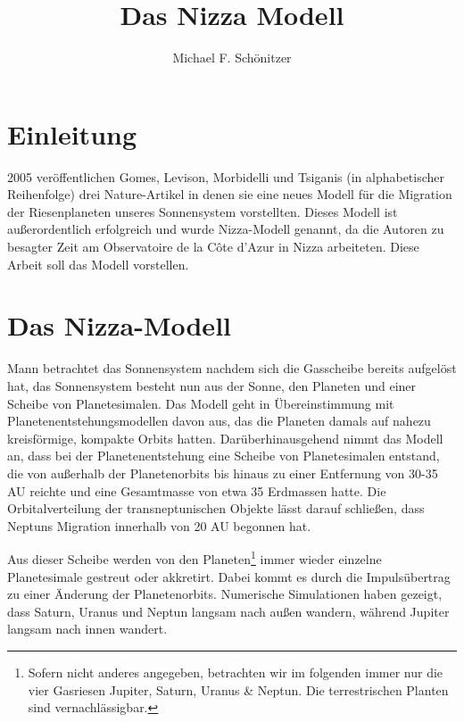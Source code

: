 \documentclass[10pt,a4paper,twoside]{article}
\author{Michael F. Schönitzer}
\title{Das Nizza Modell}
\begin{document}
\maketitle

\section{Einleitung}
2005 veröffentlichen Gomes, Levison, Morbidelli und Tsiganis (in alphabetischer Reihenfolge) drei Nature-Artikel\cite{Gomes2005}\cite{Tsiganis2005}\cite{Morbidelli2005} %
in denen sie eine neues Modell für die Migration der Riesenplaneten unseres Sonnensystem vorstellten. Dieses Modell ist außerordentlich erfolgreich und wurde Nizza-Modell genannt, da die Autoren zu besagter Zeit am Observatoire de la Côte d’Azur in Nizza arbeiteten. Diese Arbeit soll das Modell vorstellen.

\section{Das Nizza-Modell}
Mann betrachtet das Sonnensystem nachdem sich die Gasscheibe bereits aufgelöst hat, das Sonnensystem besteht nun aus der Sonne, den Planeten und einer Scheibe von Planetesimalen. Das Modell geht in Übereinstimmung mit Planetenentstehungsmodellen %
davon aus, das die Planeten damals auf nahezu kreisförmige, kompakte Orbits hatten. %
Darüberhinausgehend nimmt das Modell an, dass bei der Planetenentstehung eine Scheibe von Planetesimalen entstand, die von außerhalb der Planetenorbits bis hinaus zu einer Entfernung von 30-35 AU\cite{Tsiganis2005} reichte und eine Gesamtmasse von etwa 35 Erdmassen hatte. %
Die Orbitalverteilung der transneptunischen Objekte lässt darauf schließen, dass Neptuns Migration innerhalb von 20 AU begonnen hat.\cite{Tsiganis2005}

Aus dieser Scheibe werden von den Planeten\footnote{Sofern nicht anderes angegeben, betrachten wir im folgenden immer nur die vier Gasriesen Jupiter, Saturn, Uranus \& Neptun. Die terrestrischen Planten sind vernachlässigbar.} immer wieder einzelne Planetesimale gestreut oder akkretirt. Dabei kommt es durch die Impulsübertrag zu einer Änderung der Planetenorbits.\cite{Tsiganis2005} %
Numerische Simulationen haben gezeigt, dass Saturn, Uranus und Neptun langsam nach außen wandern, während Jupiter langsam nach innen wandert.\cite{Tsiganis2005}\cite{Hahn1999} %
\end{document}
